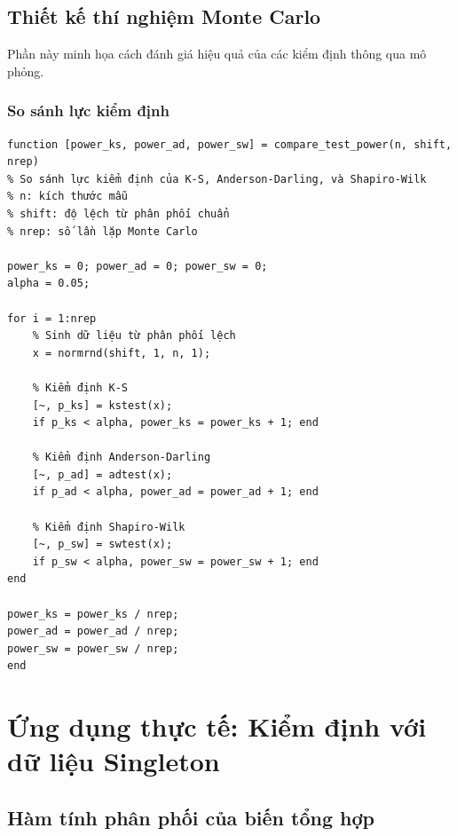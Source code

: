 \subsection{Thiết kế thí nghiệm Monte Carlo}
Phần này minh họa cách đánh giá hiệu quả của các kiểm định thông qua mô phỏng.

\subsubsection*{So sánh lực kiểm định}
\begin{matlab}
\begin{lstlisting}
function [power_ks, power_ad, power_sw] = compare_test_power(n, shift, nrep)
% So sánh lực kiểm định của K-S, Anderson-Darling, và Shapiro-Wilk
% n: kích thước mẫu
% shift: độ lệch từ phân phối chuẩn
% nrep: số lần lặp Monte Carlo

power_ks = 0; power_ad = 0; power_sw = 0;
alpha = 0.05;

for i = 1:nrep
    % Sinh dữ liệu từ phân phối lệch
    x = normrnd(shift, 1, n, 1);
    
    % Kiểm định K-S
    [~, p_ks] = kstest(x);
    if p_ks < alpha, power_ks = power_ks + 1; end
    
    % Kiểm định Anderson-Darling  
    [~, p_ad] = adtest(x);
    if p_ad < alpha, power_ad = power_ad + 1; end
    
    % Kiểm định Shapiro-Wilk
    [~, p_sw] = swtest(x);
    if p_sw < alpha, power_sw = power_sw + 1; end
end

power_ks = power_ks / nrep;
power_ad = power_ad / nrep;
power_sw = power_sw / nrep;
end
\end{lstlisting}
\end{matlab}

\section{Ứng dụng thực tế: Kiểm định với dữ liệu Singleton}

\subsection{Hàm tính phân phối của biến tổng hợp}

